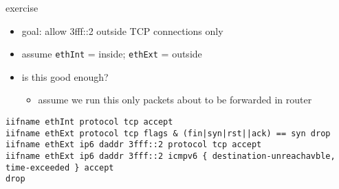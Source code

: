 \begin{frame}[fragile]{exercise}
\begin{itemize}
\item goal: allow 3fff::2 outside TCP connections only
\item assume \texttt{ethInt} = inside; \texttt{ethExt} = outside
\item is this good enough?
    \begin{itemize}
    \item assume we run this only packets about to be forwarded in router
    \end{itemize}
\end{itemize}
\begin{Verbatim}[fontsize=\fontsize{9}{10}]
iifname ethInt protocol tcp accept
iifname ethExt protocol tcp flags & (fin|syn|rst||ack) == syn drop
iifname ethExt ip6 daddr 3fff::2 protocol tcp accept
iifname ethExt ip6 daddr 3fff::2 icmpv6 { destination-unreachavble, time-exceeded } accept
drop
\end{Verbatim}
\end{frame}

